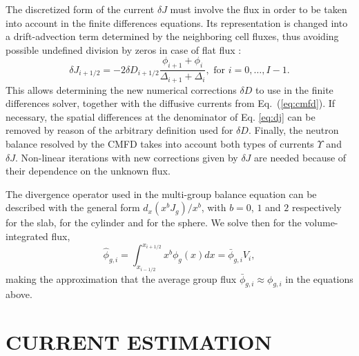 \documentclass{ictt26}
\newcommand{\eq}[1]{Eq.~(\ref{#1})}
\begin{document}
%
The discretized form of the current $\delta J$ must involve the flux in order to be taken into account in the finite differences equations. Its representation is changed into a drift-advection term determined by the neighboring cell fluxes, thus avoiding possible undefined division by zeros in case of flat flux \cite{smith1983nodal}:
\begin{equation}
  \delta J_{i+1/2} = -2 \delta D_{i+1/2} \frac{\phi_{i+1} + \phi_{i}}{\Delta_{i+1} + \Delta_{i}}, \text{ for } i = 0, \ldots, I-1.
  \label{eq:dj}
\end{equation}
This allows determining the new numerical corrections $\delta D$ to use in the finite differences solver, together with the diffusive currents from \eq{eq:cmfd}. If necessary, the spatial differences at the denominator of Eq. \ref{eq:dj} can be removed by reason of the arbitrary definition used for $\delta D$. Finally, the neutron balance resolved by the CMFD takes into account both types of currents $\Upsilon$ and $\delta J$. Non-linear iterations with new corrections given by $\delta J$ are needed because of their dependence on the unknown flux.

The divergence operator used in the multi-group balance equation can be described with the general form $d_x (x^b J_g)/ x^b$, with $b = 0$, $1$ and $2$ respectively for the slab, for the cylinder and for the sphere. We solve then for the volume-integrated flux,
\begin{equation*}
  \hat{\phi}_{g,i} = \int_{x_{i-1/2}}^{x_{i+1/2}}{ x^b \phi_g(x) dx } = \bar{\phi}_{g,i} V_i,
\end{equation*}
making the approximation that the average group flux $\bar{\phi}_{g,i} \approx \phi_{g,i}$ in the equations above.


%
%
\section{CURRENT ESTIMATION}
\label{sec:ce}
\end{document}
